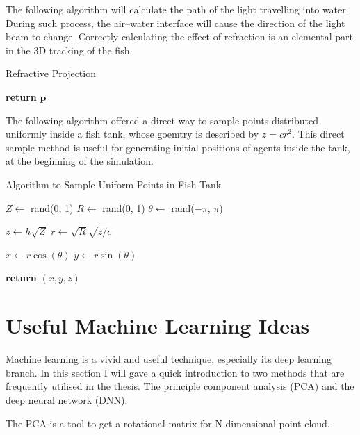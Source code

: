 \documentclass[11pt,twoside]{report}
\begin{document}
The following algorithm will calculate the path of the light travelling into water. During such process, the air--water interface will cause the direction of the light beam to change. Correctly calculating the effect of refraction is an elemental part in the 3D tracking of the fish.



\begin{algorithm}
\caption{Refractive Projection}
\label{alg:geometry-rand-cap}
\begin{algorithmic}

	
	\State \textbf{return} $\mathbf{p}$
	\EndProcedure
	
\end{algorithmic}
\end{algorithm}

The following algorithm offered a direct way to sample points distributed uniformly inside a fish tank, whose goemtry is described by $z = c r^2$. This direct sample method is useful for generating initial positions of agents inside the tank, at the beginning of the simulation.

\begin{algorithm}
\caption{Algorithm to Sample Uniform Points in Fish Tank}

\label{alg:geometry-rand-cap}
\begin{algorithmic}
	
	\State $Z \gets$ rand(0, 1)
	\State $R \gets $ rand(0, 1)
	\State $\theta \gets $ rand($-\pi$, $\pi$)
	
	\State $z \gets h \sqrt{Z}$ 
	\State $r \gets \sqrt{R} \sqrt{z / c}$
	
	\State $x \gets r \cos(\theta)$
	\State $y \gets r \sin(\theta)$
	
	\State \textbf{return} $(x, y, z)$
	
	\EndProcedure
\end{algorithmic}
\end{algorithm}


\section{Useful Machine Learning Ideas}

Machine learning is a vivid and useful technique, especially its deep learning branch. In this section I will gave a quick introduction to two methods that are frequently utilised in the thesis. The principle component analysis (PCA) and the deep neural network (DNN).

The PCA is a tool to get a rotational matrix for N-dimensional point cloud.
\end{document}
